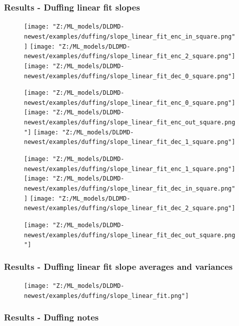 \documentclass[11pt,aspectratio=169]{beamer}
\begin{document}
    \begin{frame}
        \frametitle{Results - Duffing linear fit slopes}
        \begin{figure}
            \centering
            \begin{minipage}{.3333\textwidth}
                \texttt{[image: "Z:/ML\_models/DLDMD-newest/examples/duffing/slope\_linear\_fit\_enc\_in\_square.png"]}
                \texttt{[image: "Z:/ML\_models/DLDMD-newest/examples/duffing/slope\_linear\_fit\_enc\_2\_square.png"]}
                \texttt{[image: "Z:/ML\_models/DLDMD-newest/examples/duffing/slope\_linear\_fit\_dec\_0\_square.png"]}
            \end{minipage}%
            \begin{minipage}{.3333\textwidth}
                \texttt{[image: "Z:/ML\_models/DLDMD-newest/examples/duffing/slope\_linear\_fit\_enc\_0\_square.png"]}
                \texttt{[image: "Z:/ML\_models/DLDMD-newest/examples/duffing/slope\_linear\_fit\_enc\_out\_square.png"]}
                \texttt{[image: "Z:/ML\_models/DLDMD-newest/examples/duffing/slope\_linear\_fit\_dec\_1\_square.png"]}
            \end{minipage}%
            \begin{minipage}{.3333\textwidth}
                \texttt{[image: "Z:/ML\_models/DLDMD-newest/examples/duffing/slope\_linear\_fit\_enc\_1\_square.png"]}
                \texttt{[image: "Z:/ML\_models/DLDMD-newest/examples/duffing/slope\_linear\_fit\_dec\_in\_square.png"]}
                \texttt{[image: "Z:/ML\_models/DLDMD-newest/examples/duffing/slope\_linear\_fit\_dec\_2\_square.png"]}
            \end{minipage}
            \texttt{[image: "Z:/ML\_models/DLDMD-newest/examples/duffing/slope\_linear\_fit\_dec\_out\_square.png"]}
        \end{figure}
    \end{frame}

    \begin{frame}
        \frametitle{Results - Duffing linear fit slope averages and variances}
        \begin{figure}
            \centering
            \texttt{[image: "Z:/ML\_models/DLDMD-newest/examples/duffing/slope\_linear\_fit.png"]}
        \end{figure}
    \end{frame}

    \begin{frame}
        \frametitle{Results - Duffing notes}

    \end{frame}
\end{document}
